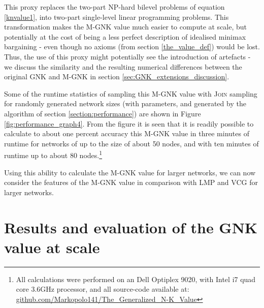This proxy replaces the two-part NP-hard bilevel problems of equation \ref{knvalue1}, into two-part single-level linear programming problems.
This transformation makes the M-GNK value much easier to compute at scale, but potentially at the cost of being a less perfect description of idealised minimax bargaining - even though no axioms (from section \ref{the_value_def}) would be lost.
Thus, the use of this proxy might potentially see the introduction of artefacts - we discuss the similarity and the resulting numerical differences between the original GNK and M-GNK in section \ref{sec:GNK_extensions_discussion}.

Some of the runtime statistics of sampling this M-GNK value with \textsc{Join} sampling for randomly generated network sizes (with parameters, and generated by the algorithm of section \ref{section:performance}) are shown in Figure \ref{fig:performance_graph4}.
From the figure it is seen that it is readily possible to calculate to about one percent accuracy this M-GNK value in three minutes of runtime for networks of up to the size of about 50 nodes, and with ten minutes of runtime up to about 80 nodes.\footnote{\label{note1} All calculations were performed on an Dell Optiplex 9020, with Intel i7 quad core 3.6GHz processor, and all source-code available at:\\
\href{https://github.com/Markopolo141/The\_Generalized\_N-K\_Value}{github.com/Markopolo141/The\_Generalized\_N-K\_Value}}

Using this ability to calculate the M-GNK value for larger networks, we can now consider the features of the M-GNK value in comparison with LMP and VCG for larger networks.





\section{Results and evaluation of the GNK value at scale}\label{sec:results_and_evaluation_of_GNK}



